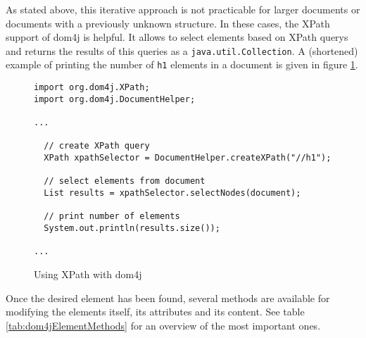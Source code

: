As stated above, this iterative approach is not practicable for larger documents or documents with a previously unknown structure. In these cases, the XPath support of dom4j is helpful. It allows to select elements based on XPath querys and returns the results of this queries as a \texttt{java.util.Collection}. A (shortened) example of printing the number of \texttt{h1} elements in a document is given in figure \ref{fig:UsingXPathWithDom4j}.

\begin{figure}[htbp]
	
\begin{verbatim}
import org.dom4j.XPath;
import org.dom4j.DocumentHelper;

...

  // create XPath query
  XPath xpathSelector = DocumentHelper.createXPath("//h1");
  
  // select elements from document
  List results = xpathSelector.selectNodes(document);
  
  // print number of elements
  System.out.println(results.size());
  
... 
\end{verbatim}
	\caption{Using XPath with dom4j}
	\label{fig:UsingXPathWithDom4j}
\end{figure}



Once the desired element has been found, several methods are available for modifying the elements itself, its attributes and its content. See table \ref{tab:dom4jElementMethods} for an overview of the most important ones.

